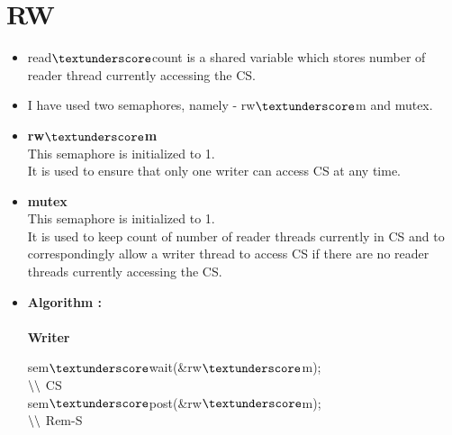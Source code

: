 \documentclass[12pt]{article}
\begin{document}
\section{RW}
\begin{itemize}
\item read$\textunderscore$count is a shared variable which stores number of reader thread currently accessing the CS.
\item I have used two semaphores, namely - rw$\textunderscore$m and mutex.
\item \textbf{rw$\textunderscore$m}\\
This semaphore is initialized to 1.\\
It is used to ensure that only one writer can access CS at any time.\\
\item \textbf{mutex}\\
This semaphore is initialized to 1.\\
It is used to keep count of number of reader threads currently in CS and to correspondingly allow a writer thread to access CS if there are no reader threads currently accessing the CS.\\
\item \textbf{Algorithm :}\\\\

\textbf{Writer}\\
\begin{tcolorbox}[enhanced jigsaw,colback=bg,boxrule=0pt,arc=0pt]
sem$\textunderscore$wait(\&rw$\textunderscore$m);\\
$\char`\\\char`\\$ CS\\
sem$\textunderscore$post(\&rw$\textunderscore$m);\\
$\char`\\\char`\\$ Rem-S
\end{tcolorbox}


\end{itemize}
\end{document}
